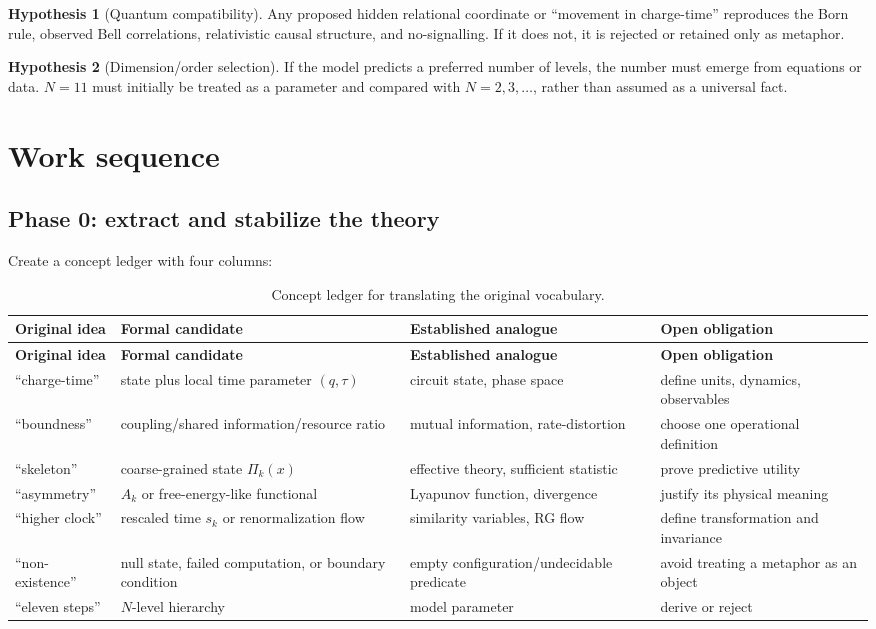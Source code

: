 \documentclass[11pt]{article}
\newcommand{\Coarse}{\Pi}
\theoremstyle{definition}
\newtheorem{hypothesis}{Hypothesis}
\theoremstyle{plain}
\theoremstyle{remark}
\begin{document}
\begin{hypothesis}[Quantum compatibility]\label{hyp:H6}
Any proposed hidden relational coordinate or ``movement in charge-time'' reproduces the Born rule, observed Bell correlations, relativistic causal structure, and no-signalling. If it does not, it is rejected or retained only as metaphor.
\end{hypothesis}

\begin{hypothesis}[Dimension/order selection]\label{hyp:H7}
If the model predicts a preferred number of levels, the number must emerge from equations or data. $N=11$ must initially be treated as a parameter and compared with $N=2,3,\ldots$, rather than assumed as a universal fact.
\end{hypothesis}

\section{Work sequence}

\subsection{Phase 0: extract and stabilize the theory}

Create a concept ledger with four columns:

\begin{longtable}{P{0.20\textwidth}P{0.23\textwidth}P{0.24\textwidth}P{0.25\textwidth}}
\caption{Concept ledger for translating the original vocabulary.}\label{tab:concept-ledger}\\
\toprule
\textbf{Original idea} & \textbf{Formal candidate} & \textbf{Established analogue} & \textbf{Open obligation}\\
\midrule
\endfirsthead
\toprule
\textbf{Original idea} & \textbf{Formal candidate} & \textbf{Established analogue} & \textbf{Open obligation}\\
\midrule
\endhead
``charge-time'' & state plus local time parameter $(q,\tau)$ & circuit state, phase space & define units, dynamics, observables\\
``boundness'' & coupling/shared information/resource ratio & mutual information, rate-distortion & choose one operational definition\\
``skeleton'' & coarse-grained state $\Coarse_k(x)$ & effective theory, sufficient statistic & prove predictive utility\\
``asymmetry'' & $A_k$ or free-energy-like functional & Lyapunov function, divergence & justify its physical meaning\\
``higher clock'' & rescaled time $s_k$ or renormalization flow & similarity variables, RG flow & define transformation and invariance\\
``non-existence'' & null state, failed computation, or boundary condition & empty configuration/undecidable predicate & avoid treating a metaphor as an object\\
``eleven steps'' & $N$-level hierarchy & model parameter & derive or reject\\
\bottomrule
\end{longtable}
\end{document}
